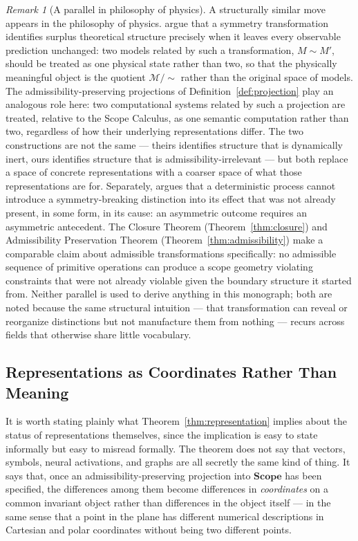 \documentclass[11pt,twoside,openright]{book}
\numberwithin{equation}{chapter}
\theoremstyle{definition}
\theoremstyle{plain}
\theoremstyle{remark}
\newtheorem{remark}[definition]{Remark}
\theoremstyle{definition}
\newcommand{\CatScope}{\mathbf{Scope}}
\begin{document}
\begin{remark}[A parallel in philosophy of physics]
A structurally similar move appears in the philosophy of physics.
\citet{IsmaelVanFraassen2003} argue that a symmetry transformation
identifies surplus theoretical structure precisely when it leaves every
observable prediction unchanged: two models related by such a
transformation, $M\sim M'$, should be treated as one physical state
rather than two, so that the physically meaningful object is the
quotient $\mathcal{M}/\!\sim$ rather than the original space of models.
The admissibility-preserving projections of
Definition~\ref{def:projection} play an analogous role here: two
computational systems related by such a projection are treated, relative
to the Scope Calculus, as one semantic computation rather than two,
regardless of how their underlying representations differ. The two
constructions are not the same --- theirs identifies structure that is
dynamically inert, ours identifies structure that is
admissibility-irrelevant --- but both replace a space of concrete
representations with a coarser space of what those representations are
for. Separately, \citet{Ismael1997} argues that a deterministic process
cannot introduce a symmetry-breaking distinction into its effect that was
not already present, in some form, in its cause: an asymmetric outcome
requires an asymmetric antecedent. The Closure Theorem
(Theorem~\ref{thm:closure}) and Admissibility Preservation Theorem
(Theorem~\ref{thm:admissibility}) make a comparable claim about
admissible transformations specifically: no admissible sequence of
primitive operations can produce a scope geometry violating constraints
that were not already violable given the boundary structure it started
from. Neither parallel is used to derive anything in this monograph; both
are noted because the same structural intuition --- that transformation
can reveal or reorganize distinctions but not manufacture them from
nothing --- recurs across fields that otherwise share little vocabulary.
\end{remark}

\subsection{Representations as Coordinates Rather Than Meaning}

It is worth stating plainly what Theorem~\ref{thm:representation}
implies about the status of representations themselves, since the
implication is easy to state informally but easy to misread formally.
The theorem does not say that vectors, symbols, neural activations, and
graphs are all secretly the same kind of thing. It says that, once an
admissibility-preserving projection into $\CatScope$ has been specified,
the differences among them become differences in \emph{coordinates} on a
common invariant object rather than differences in the object itself ---
in the same sense that a point in the plane has different numerical
descriptions in Cartesian and polar coordinates without being two
different points.
\end{document}
